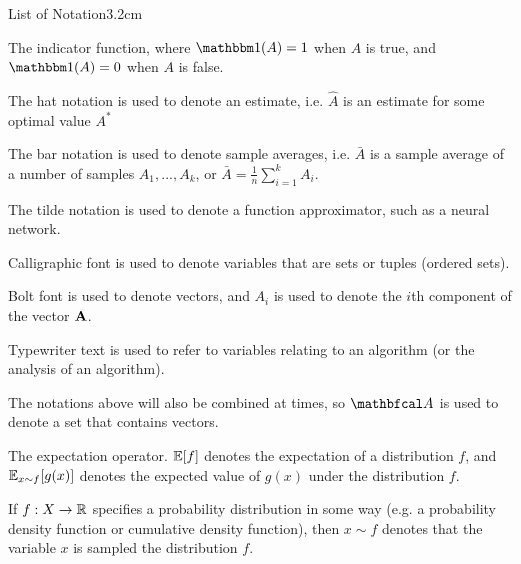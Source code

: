 \begin{mclistof}{List of Notation}{3.2cm}
    \item[\Large\textbf{General Notation}\hfill\hfill]
    \item[$\one$] 
        The indicator function, where $\one(A)=1$ when $A$ is true, and $\one(A)=0$ when $A$ is false. 
    \item[$\hat{A}$] 
        The hat notation is used to denote an estimate, i.e. $\hat{A}$ is an estimate for some optimal value $A^*$
    \item[$\bar{A}$] 
        The bar notation is used to denote sample averages, i.e. $\bar{A}$ is a sample average of a number of samples $A_1,...,A_k$, or $\bar{A}=\frac{1}{n}\sum_{i=1}^k A_i$.
    \item[$\tilde{A}$] 
        The tilde notation is used to denote a function approximator, such as a neural network.
    \item[$\cl{A}$] 
        Calligraphic font is used to denote variables that are sets or tuples (ordered sets).
    \item[$\bff{A}$] 
        Bolt font is used to denote vectors, and $A_i$ is used to denote the $i$th component of the vector $\bff{A}$.
    \item[$\texttt{A}$]
        Typewriter text is used to refer to variables relating to an algorithm (or the analysis of an algorithm).
    \item[$\bfcl{A}$] 
        The notations above will also be combined at times, so $\bfcl{A}$ is used to denote a set that contains vectors.
    \item[$\bb{E}$] 
        The expectation operator. $\mathbb{E}[f]$ denotes the expectation of a distribution $f$, and $\mathbb{E}_{x\sim f}[g(x)]$ denotes the expected value of $g(x)$ under the distribution $f$.
    \item[$x\sim f$] 
        If $f:X\rightarrow\mathbb{R}$ specifies a probability distribution in some way (e.g. a probability density function or cumulative density function), then $x\sim f$ denotes that the variable $x$ is sampled the distribution $f$.
    \\
    \item[{\parbox[t]{\textwidth}{
            \Large\textbf{(Multi-Objective) Markov Decision Processes \\(Defined in Sections \ref{sec:2-2-mdps} and \ref{sec:2-5-morl})}\hfill\hfill
          }}]
    \item[$\cl{A}$]

\end{mclistof}
